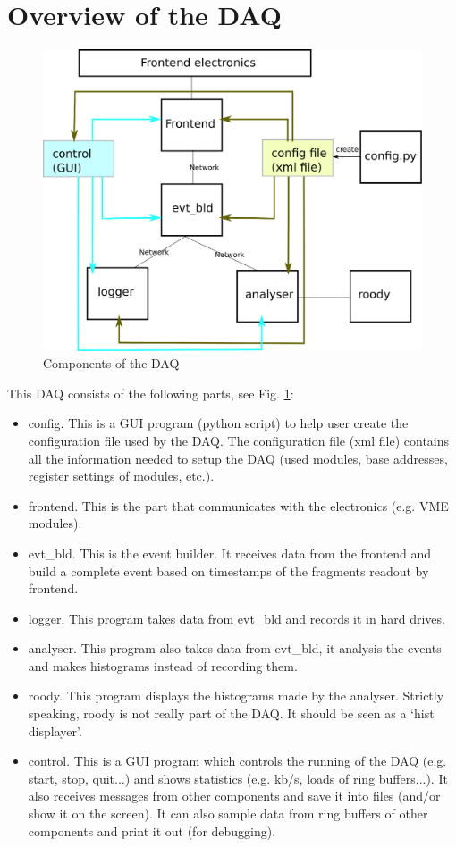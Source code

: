 \documentclass[a4paper,12pt]{article}
\begin{document}
	\section{Overview of the DAQ}
	\begin{figure}
		\begin{center}
			\includegraphics[width=.7\textwidth]{figs/daq_scheme.eps}
			\caption{\label{fig01}Components of the DAQ }
		\end{center}
	\end{figure}
	This DAQ consists of the following parts, see Fig. \ref{fig01}:
	\begin{itemize}
		\item config. This is a GUI program (python script) to help user
			create the configuration file used by the DAQ. The configuration
			file (xml file) contains all the information needed to setup the
			DAQ (used modules, base addresses, register settings of modules,
			etc.).
		\item frontend. This is the part that communicates with the
			electronics (e.g. VME modules).
		\item evt\_bld. This is the event builder. It receives data from the
			frontend and build a complete event based on timestamps of the
			fragments readout by frontend.
		\item logger. This program takes data from evt\_bld and records it
			in hard drives.
		\item analyser. This program also takes data from evt\_bld, it
			analysis the events and makes histograms instead of recording
			them.
		\item roody. This program displays the histograms made by the
			analyser. Strictly speaking, roody is not really part of the
			DAQ. It should be seen as a `hist displayer'.
		\item control. This is a GUI program which controls the running of
			the DAQ (e.g.  start, stop, quit...) and shows statistics (e.g.
			kb/s, loads of ring buffers...). It also receives messages from
			other components and save it into files (and/or show it on the
			screen). It can also sample data from ring buffers of other
			components and print it out (for debugging).
	\end{itemize}
\end{document}
